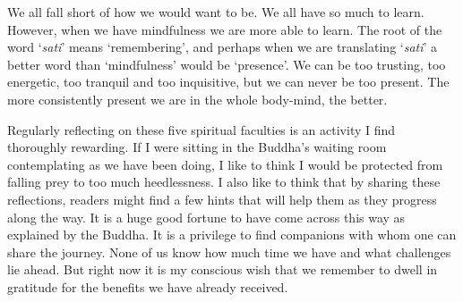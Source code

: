We all fall short of how we would want to be. We all have so much to
learn. However, when we have mindfulness we are more able to learn. The
root of the word `\emph{sati}' means `remembering', and perhaps when we are
translating `\emph{sati}' a better word than `mindfulness' would be
`presence'. We can be too trusting, too energetic, too tranquil and too
inquisitive, but we can never be too present. The more consistently
present we are in the whole body-mind, the better.

Regularly reflecting on these five spiritual faculties is an activity I
find thoroughly rewarding. If I were sitting in the Buddha's waiting
room contemplating as we have been doing, I like to think I would be
protected from falling prey to too much heedlessness. I also like to
think that by sharing these reflections, readers might find a few hints
that will help them as they progress along the way. It is a huge good
fortune to have come across this way as explained by the Buddha. It is a
privilege to find companions with whom one can share the journey. None
of us know how much time we have and what challenges lie ahead. But
right now it is my conscious wish that we remember to dwell in gratitude
for the benefits we have already received.

